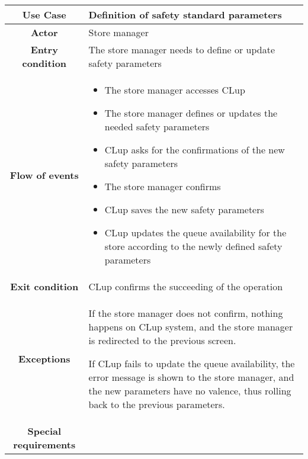 \documentclass[../../main.tex]{subfiles}
\begin{document}
      \begin{table}[H]
        \centering
          \begin{tabular}{c m{}}
          \hline
          \textbf{Use Case} & Definition of safety standard parameters\\ \hline
          \textbf{Actor} & Store manager\\ \hline
          \textbf{Entry condition} & The store manager needs to define or update safety parameters \\  \hline
          \textbf{Flow of events} & \begin{itemize}
                                      \item The store manager accesses CLup
                                      \item The store manager defines or updates the needed safety parameters
                                      \item CLup asks for the confirmations of the new safety parameters
                                      \item The store manager confirms
                                      \item CLup saves the new safety parameters
                                      \item CLup updates the queue availability for the store according to the newly defined safety parameters
                                    \end{itemize}\\ \hline
          \textbf{Exit condition} & CLup confirms the succeeding of the operation \\ \hline
          \textbf{Exceptions} & If the store manager does not confirm, nothing happens on CLup system, and the store manager is redirected to the previous screen.

                                If CLup fails to update the queue availability, the error message is shown to the store manager, and the new parameters have no valence, thus rolling back to the previous parameters.
                                \\ \hline
          \textbf{Special requirements} &\\ \hline
          \end{tabular}
      \end{table}

\end{document}
